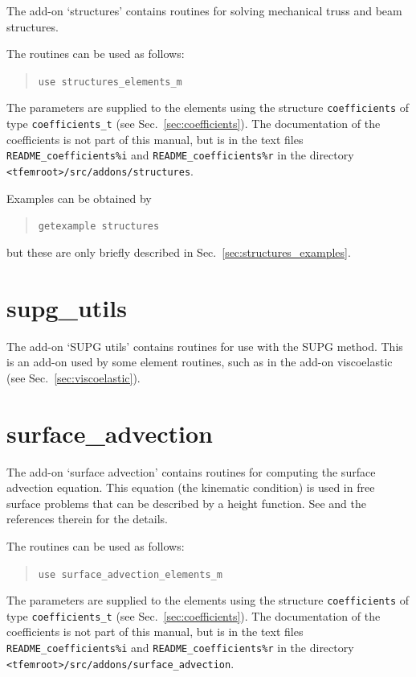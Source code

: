 The add-on `structures' contains routines for solving mechanical truss and beam structures.

The routines can be used as follows:
\begin{quote}
   \texttt{use structures\_elements\_m}
\end{quote}

The parameters are
supplied to the elements using the structure \texttt{coefficients} of type
\texttt{coefficients\_t} (see Sec.~\ref{sec:coefficients}). The documentation
of the coefficients is not part of this manual, but is in the text files
\texttt{README\_coefficients\%i} and
\texttt{README\_coefficients\%r} in the directory
\texttt{<tfemroot>/src/addons/structures}.

Examples can be obtained by
\begin{quote}
   \texttt{getexample structures}
\end{quote}
but these are only briefly described in Sec.~\ref{sec:structures_examples}.

\section{supg\_utils}
\label{sec:supg_utils}

The add-on `SUPG utils' contains routines for use with the SUPG method.
This is an add-on used by some element routines, such as in the add-on
viscoelastic (see Sec.~\ref{sec:viscoelastic}).

\section{surface\_advection}
\label{sec:surfaceadvection}

The add-on `surface advection' contains routines for computing the surface
advection equation. This equation (the kinematic condition)
is used in free surface problems that can be described by a height function.
See \cite{Choi11c,Choi11b} and the references therein for the details.

The routines can be used as follows:
\begin{quote}
   \texttt{use surface\_advection\_elements\_m}
\end{quote}

The parameters are
supplied to the elements using the structure \texttt{coefficients} of type
\texttt{coefficients\_t} (see Sec.~\ref{sec:coefficients}). The documentation
of the coefficients is not part of this manual, but is in the text files
\texttt{README\_coefficients\%i} and
\texttt{README\_coefficients\%r} in the directory
\texttt{<tfemroot>/src/addons/surface\_advection}.

